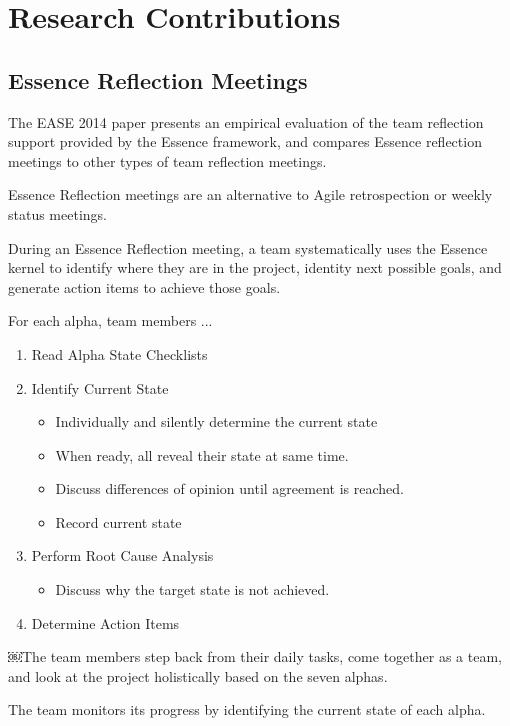 \documentclass[preprint,12pt,3p]{elsarticle}
\begin{document}
\section{Research Contributions}

\subsection{Essence Reflection Meetings}
\label{EssenceReflectionMeetings}

The EASE 2014 paper presents an empirical evaluation of the team reflection support provided by the Essence framework, and compares Essence reflection meetings to other types of team reflection meetings.

Essence Reflection meetings are an alternative to Agile retrospection or weekly status meetings. 

During an Essence Reflection meeting, a team systematically uses the Essence kernel to identify where they are in the project, identity next possible goals, and generate action items to achieve those goals. 

For each alpha, team members ...
\begin{enumerate}
\item Read Alpha State Checklists
\item Identify Current State
    \begin{itemize}
    \item Individually and silently determine the current state
    \item When ready, all reveal their state at same time.
    \item Discuss differences of opinion until agreement is reached.
    \item Record current state
    \end{itemize}
\item Perform Root Cause Analysis
    \begin{itemize}
    \item Discuss why the target state is not achieved.
    \end{itemize}
\item Determine Action Items    
\end{enumerate}

￼The team members step back from their daily tasks, come together as a team, and look 
at the project holistically based on the seven alphas.

The team monitors its progress by identifying the current state of each alpha. 
\end{document}
